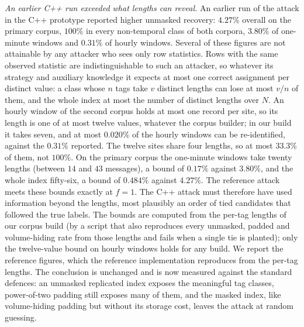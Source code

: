 \documentclass[11pt,a4paper]{article}
\newcommand{\authorcheck}[1]{}
\begin{document}
\emph{An earlier C++ run exceeded what lengths can reveal.} An earlier run of the
attack in the C++ prototype reported higher unmasked recovery: $4.27\%$
overall on the primary corpus, $100\%$ in every non-temporal class of both
corpora, $3.80\%$ of one-minute windows and $0.31\%$ of hourly windows. Several
of these figures are not attainable by any attacker who sees only row
statistics. Rows with the same observed statistic are indistinguishable to such
an attacker, so whatever its strategy and auxiliary knowledge it expects at
most one correct assignment per distinct value: a class whose $n$ tags take
$v$ distinct lengths can lose at most $v/n$ of them, and the whole index at
most the number of distinct lengths over $N$. An hourly window of the second
corpus holds at most one record per site, so its length is one of at most
twelve values, whatever the corpus builder; in our build it takes seven, and at
most $0.020\%$ of the hourly windows can be re-identified, against the $0.31\%$
reported. The twelve sites share four lengths, so at most $33.3\%$ of them, not
$100\%$. On the primary corpus the one-minute windows take twenty lengths
(between $14$ and $43$ messages), a bound of $0.17\%$ against $3.80\%$, and the
whole index fifty-six, a bound of $0.484\%$ against $4.27\%$. The reference
attack meets these bounds exactly at $f=1$. The C++ attack must therefore have
used information beyond the lengths, most plausibly an order of tied
candidates that followed the true labels. The bounds are computed from the
per-tag lengths of our corpus build (by a script that
also reproduces every unmasked, padded and volume-hiding rate from those
lengths and fails when a single tie is planted); only the twelve-value bound on
hourly windows holds for any build. We report the reference figures, which the
reference implementation reproduces from the per-tag lengths. The conclusion
is unchanged and is now measured against the standard defences: an unmasked
replicated index exposes the meaningful tag classes, power-of-two padding
still exposes many of them, and the masked index, like volume-hiding padding
but without its storage cost, leaves the attack at random guessing.
\authorcheck{If the C++ prototype is released, check its attack's
tie-breaking and compare its per-tag lengths with results/lengths\_*.csv.gz.}


\end{document}
